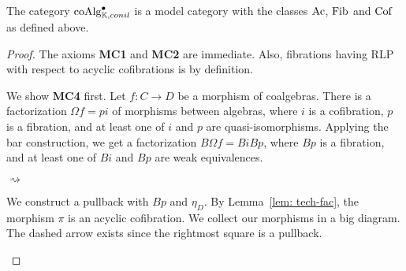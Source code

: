 \documentclass[../thesis.tex]{subfiles}
\begin{document}
            \begin{thm}\label{thm: model-coalg}
                The category $\tt{coAlg}^\bullet_{\mathbb{K}, conil}$ is a model category with the classes $\tt{Ac}$, $\tt{Fib}$ and $\tt{Cof}$ as defined above.
            \end{thm}

            \begin{proof}
                The axioms \textbf{MC1} and \textbf{MC2} are immediate. Also, fibrations having RLP with respect to acyclic cofibrations is by definition.

                We show \textbf{MC4} first. Let $f: C\rightarrow D$ be a morphism of coalgebras. There is a factorization $\Omega f = pi$ of morphisms between algebras, where $i$ is a cofibration, $p$ is a fibration, and at least one of $i$ and $p$ are quasi-isomorphisms. Applying the bar construction, we get a factorization $B\Omega f = BiBp$, where $Bp$ is a fibration, and at least one of $Bi$ and $Bp$ are weak equivalences.
                \begin{center}
                     $\rightsquigarrow$
                \end{center}

                We construct a pullback with $Bp$ and $\eta_D$. By Lemma~\ref{lem: tech-fac}, the morphism $\pi$ is an acyclic cofibration. We collect our morphisms in a big diagram. The dashed arrow exists since the rightmost square is a pullback.
                \begin{center}
                \end{center}
                

\end{proof}
\end{document}
